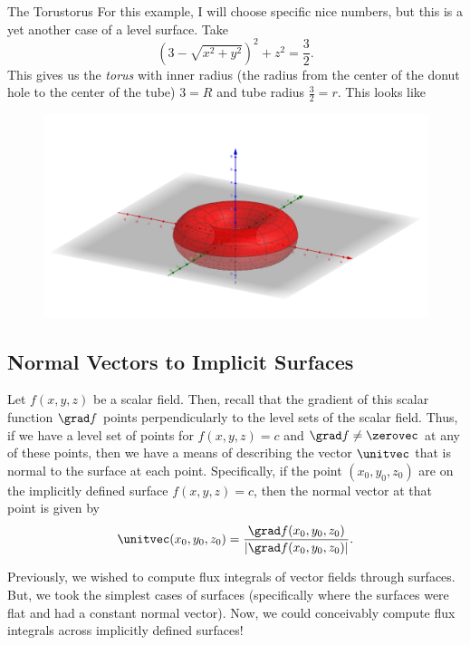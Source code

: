                 \begin{ex}{The Torus}{torus}
                For this example, I will choose specific nice numbers, but this is a yet another case of a level surface.  Take
                \[
                \left(3-\sqrt{x^2+y^2}\right)^2+z^2=\frac{3}{2}.
                \]
                This gives us the \emph{torus} with inner radius (the radius from the center of the donut hole to the center of the tube) $3=R$ and tube radius $\frac{3}{2}=r$. This looks like
                \begin{figure}[H]
                    \centering
                    \includegraphics[width=.8\textwidth]{Figures_Part_6/torus.png}
                \end{figure}
                \end{ex}
                
                
                 \subsection{Normal Vectors to Implicit Surfaces}
                 
                 Let $f(x,y,z)$ be a scalar field.  Then, recall that the gradient of this scalar function $\grad f$ points perpendicularly to the level sets of the scalar field.  Thus, if we have a level set of points for $f(x,y,z)=c$ and $\grad f \neq \zerovec$ at any of these points, then we have a means of describing the vector $\unitvec$ that is normal to the surface at each point.  Specifically, if the point $(x_0,y_0,z_0)$ are on the implicitly defined surface $f(x,y,z)=c$, then the normal vector at that point is given by
                 \[
                 \unitvec(x_0,y_0,z_0) = \frac{\grad f(x_0,y_0,z_0)}{|\grad f(x_0,y_0,z_0)|}.
                 \]
                 
                 Previously, we wished to compute flux integrals of vector fields through surfaces.  But, we took the simplest cases of surfaces (specifically where the surfaces were flat and had a constant normal vector).  Now, we could conceivably compute flux integrals across implicitly defined surfaces!
                 
